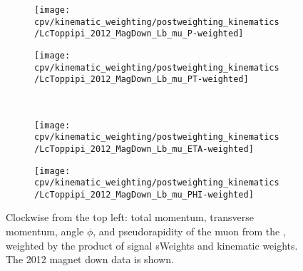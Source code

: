 \begin{figure}
  \begin{subfigure}[b]{0.4\textwidth}
    \texttt{[image: cpv/kinematic\_weighting/postweighting\_kinematics/LcToppipi\_2012\_MagDown\_Lb\_mu\_P-weighted]}
    \label{fig:cpv:kinematic_weighting:post:Lb_mu:P}
  \end{subfigure}
  \begin{subfigure}[b]{0.4\textwidth}
    \texttt{[image: cpv/kinematic\_weighting/postweighting\_kinematics/LcToppipi\_2012\_MagDown\_Lb\_mu\_PT-weighted]}
    \label{fig:cpv:kinematic_weighting:post:Lb_mu:PT}
  \end{subfigure}\\
  \begin{subfigure}[b]{0.4\textwidth}
    \texttt{[image: cpv/kinematic\_weighting/postweighting\_kinematics/LcToppipi\_2012\_MagDown\_Lb\_mu\_ETA-weighted]}
    \label{fig:cpv:kinematic_weighting:post:Lb_mu:ETA}
  \end{subfigure}
  \begin{subfigure}[b]{0.4\textwidth}
    \texttt{[image: cpv/kinematic\_weighting/postweighting\_kinematics/LcToppipi\_2012\_MagDown\_Lb\_mu\_PHI-weighted]}
    \label{fig:cpv:kinematic_weighting:post:Lb_mu:PHI}
  \end{subfigure}
  \caption{%
    Clockwise from the top left: total momentum, transverse momentum, angle 
    $\phi$, and pseudorapidity of the muon from the \PLambdab, weighted by the 
    product of signal sWeights and kinematic weights.
    The 2012 magnet down data is shown.
  }
  \label{fig:cpv:kinematic_weighting:post:Lb_mu}
\end{figure}

